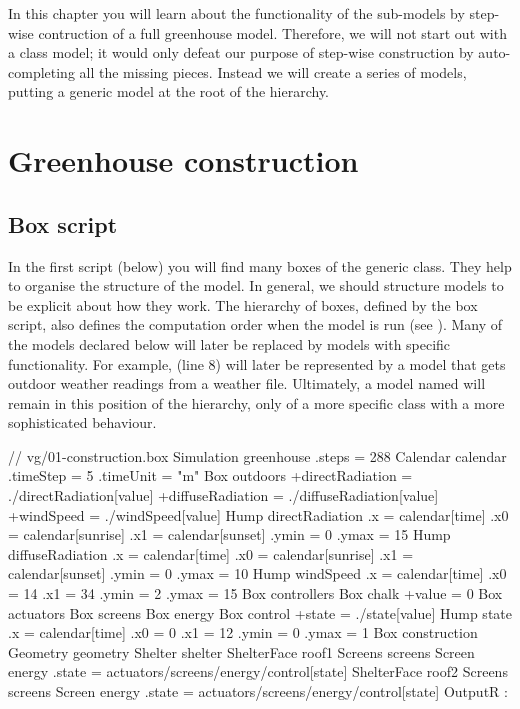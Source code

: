 In this chapter you will learn about the functionality of the  sub-models by step-wise contruction of a full greenhouse model. Therefore, we will not start out with a  class model; it would only defeat our purpose of step-wise construction by auto-completing all the missing pieces. Instead we will create a series of models, putting a generic  model at the root of the hierarchy.

\section{Greenhouse construction}
\subsection{Box script}
In the first script (below) you will find many boxes of the generic  class. They help to organise the structure of the model. In general, we should structure models to be explicit about how they work. The hierarchy of boxes, defined by the box script, also defines the computation order when the model is run (see ). Many of the  models declared below will later be replaced by models with specific functionality. For example,  (line 8) will later be represented by a model that gets outdoor weather readings from a weather file. Ultimately, a model named  will remain in this position of the hierarchy, only of a more specific class with a more sophisticated behaviour.

\lstset{numbers=left}
\begin{boxscript}
// vg/01-construction.box
Simulation greenhouse {
	.steps = 288
	Calendar calendar {
		.timeStep = 5
		.timeUnit = "m"
	}
	Box outdoors {
		+directRadiation = ./directRadiation[value]
		+diffuseRadiation = ./diffuseRadiation[value]
		+windSpeed = ./windSpeed[value]
		Hump directRadiation {
			.x = calendar[time]
			.x0 = calendar[sunrise]
			.x1 = calendar[sunset]
			.ymin = 0
			.ymax = 15
		}
		Hump diffuseRadiation {
			.x = calendar[time]
			.x0 = calendar[sunrise]
			.x1 = calendar[sunset]
			.ymin = 0
			.ymax = 10
		}
		Hump windSpeed {
			.x = calendar[time]
			.x0 = 14
			.x1 = 34
			.ymin = 2
			.ymax = 15
		}
	}
	Box controllers {
		Box chalk {
			+value = 0
		}
	}
	Box actuators {
		Box screens {
			Box energy {
				Box control {
					+state = ./state[value]
					Hump state {
						.x = calendar[time]
						.x0 = 0
						.x1 = 12
						.ymin = 0
						.ymax = 1
					}
				}
			}
		}
	}
	Box construction {
		Geometry geometry {
		}
		Shelter shelter {
			ShelterFace roof1 {
				Screens screens {
					Screen energy {
						.state = actuators/screens/energy/control[state]
					}
				}
			}
			ShelterFace roof2 {
				Screens screens {
					Screen energy {
						.state = actuators/screens/energy/control[state]
					}
				}
			}
		}
	}
	OutputR {
	:
	}
}
\end{boxscript}
\lstset{numbers=none}

